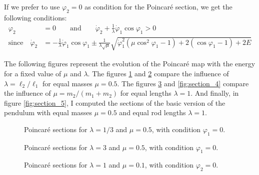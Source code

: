 \documentclass[11 pt]{article}
\begin{document}
If we prefer to use $\varphi_2=0$ as condition for the Poincaré section, we get the following conditions:
\begin{align}
    \varphi_2 &= 0 \qquad \text{and} \qquad \dot \varphi_2 + \frac{1}{\lambda} \dot \varphi_1 \cos{\varphi_1} > 0 \label{eq:condition2}\\
    \text{since} \quad \dot \varphi_2 &= -\frac{1}{\lambda} \dot \varphi_1 \cos{\varphi_1} \pm \frac{1}{\lambda \sqrt{\mu}} \sqrt{\dot \varphi_1^2 \left(\mu \cos^{2}\varphi_1 - 1\right) + 2 (\cos{\varphi_1} - 1) + 2E}\nonumber
\end{align}

The following figures represent the evolution of the Poincaré map with the energy for a fixed value of $\mu$ and $\lambda$. The figures \ref{fig:section_1} and \ref{fig:section_2} compare the influence of $\lambda=\ell_2 / \ell_1$ for equal masses $\mu=0.5$. The figures \ref{fig:section_3} and \ref{fig:section_4} compare the influence of $\mu=m_2 / (m_1+m_2)$ for equal lengths $\lambda=1$. And finally, in figure \ref{fig:section_5}, I computed the sections of the basic version of the pendulum with equal masses $\mu=0.5$ and equal rod lengths $\lambda=1$.


\begin{figure}[H]
    \centering
    
    \caption{Poincaré sections for $\lambda=1/3$ and $\mu=0.5$, with condition $\varphi_1=0$.}
    \label{fig:section_1}
\end{figure}

\begin{figure}[H]
    \centering
    
    \caption{Poincaré sections for $\lambda=3$ and $\mu=0.5$, with condition $\varphi_1=0$.}
    \label{fig:section_2}
\end{figure}

\begin{figure}[H]
    \centering
    
    \caption{Poincaré sections for $\lambda=1$ and $\mu=0.1$, with condition $\varphi_2=0$.}
    \label{fig:section_3}
\end{figure}
\end{document}
